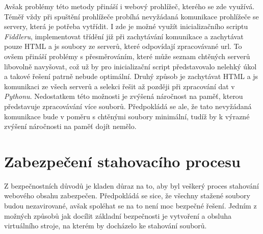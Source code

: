 \documentclass[thesis=M,czech,hidelinks]{FITthesis}[2013/05/06]
\begin{document}
Avšak problémy této metody přináší i webový prohlížeč, kterého se zde využívá. Téměř vždy při spuštění prohlížeče probíhá nevyžádaná komunikace prohlížeče se servery, která je potřeba vytřídit. I zde je možné využít inicializačního scriptu \textit{Fiddleru}, implementovat třídění již při zachytávání komunikace a zachytávat pouze HTML a js soubory ze serverů, které odpovídají zpracovávané url. To ovšem přináší problémy s přesměrováním, které může seznam chtěných serverů libovolně navyšovat, což už by pro inicializační script představovalo nelehký úkol a takové řešení patrně nebude optimální. Druhý způsob je zachytávat HTML a js komunikaci ze všech serverů a selekci řešit až později při zpracování dat v \textit{Pythonu}. Nedostatkem této možnosti je zvýšená náročnost na paměť, kterou představuje zpracovávání více souborů. Předpokládá se ale, že tato nevyžádaná komunikace bude v poměru s chtěnými soubory minimální, tudíž by k výrazné zvýšení náročnosti na paměť dojít nemělo.





\section{Zabezpečení stahovacího procesu}
Z bezpečnostních důvodů je kladen důraz na to, aby byl veškerý proces stahování webového obsahu zabezpečen. Předpokládá se sice, že všechny stažené soubory budou nezavirované, avšak spoléhat se na to není moc bezpečné řešení. Jedním z možných způsobů jak docílit základní bezpečnosti je vytvoření a obsluha virtuálního stroje, na kterém by docházelo ke stahování souborů. 
\end{document}
